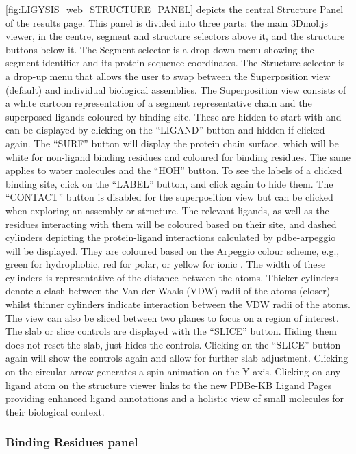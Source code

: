 \autoref{fig:LIGYSIS_web_STRUCTURE_PANEL} depicts the central Structure Panel of the results page. This panel is divided into three parts: the main 3Dmol.js viewer, in the centre, segment and structure selectors above it, and the structure buttons below it. The Segment selector  is a drop-down menu showing the segment identifier and its protein sequence coordinates. The Structure selector is a drop-up menu that allows the user to swap between the Superposition view (default) and individual biological assemblies. The Superposition view consists of a white cartoon representation of a segment representative chain and the superposed ligands coloured by binding site. These are hidden to start with and can be displayed by clicking on the ``LIGAND'' button and hidden if clicked again. The ``SURF'' button will display the protein chain surface, which will be white for non-ligand binding residues and coloured for binding residues. The same applies to water molecules and the ``HOH'' button. To see the labels of a clicked binding site, click on the ``LABEL'' button, and click again to hide them. The ``CONTACT'' button is disabled for the superposition view but can be clicked when exploring an assembly or structure. The relevant ligands, as well as the residues interacting with them will be coloured based on their site, and dashed cylinders depicting the protein-ligand interactions calculated by pdbe-arpeggio will be displayed. They are coloured based on the Arpeggio colour scheme, e.g., green for hydrophobic, red for polar, or yellow for ionic \cite{JUBB_2017_ARPEGGIO}. The width of these cylinders is representative of the distance between the atoms. Thicker cylinders denote a clash between the Van der Waals (VDW) radii of the atoms (closer) whilst thinner cylinders indicate interaction between the VDW radii of the atoms. The view can also be sliced between two planes to focus on a region of interest. The slab or slice controls are displayed with the ``SLICE'' button. Hiding them does not reset the slab, just hides the controls. Clicking on the ``SLICE'' button again will show the controls again and allow for further slab adjustment. Clicking on the circular arrow generates a spin animation on the Y axis. Clicking on any ligand atom on the structure viewer links to the new PDBe-KB Ligand Pages \cite{CHOUDHARY_2024_PDBETOOLS} providing enhanced ligand annotations and a holistic view of small molecules for their biological context.

\subsubsection{Binding Residues panel}

